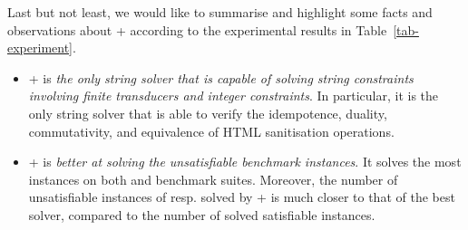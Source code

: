 Last but not least, we would like to summarise and highlight some facts and observations about {\ostrich}+  according to the experimental results in Table~\ref{tab-experiment}.
\begin{itemize}
\item {\ostrich}+ is \emph{the only string solver that is capable of solving string constraints involving finite transducers and integer constraints}. In particular, it is the only string solver that is able to verify the idempotence, duality, commutativity, and equivalence of HTML sanitisation operations.
%
\item {\ostrich}+ is \emph{better at solving the unsatisfiable benchmark instances}. It solves the most instances on both {\slogbenchra} and {\slogbenchr} benchmark suites. Moreover, the number of unsatisfiable instances of {\pyexbench} resp. {\kaluzabench} solved by {\ostrich}+ is much closer to that of the best solver, compared to the number of solved satisfiable instances.   
\end{itemize}





